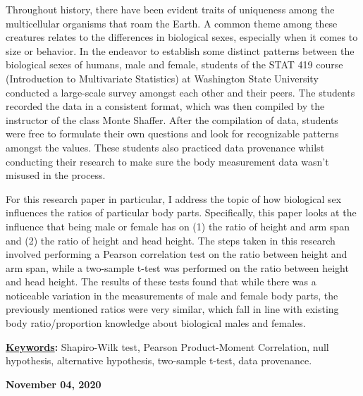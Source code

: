 \documentclass[]{article}
\renewenvironment{abstract}
 {{%
    \setlength{\leftmargin}{0mm}
    \setlength{\rightmargin}{\leftmargin}%
  }%
  \relax}
 {\endlist}
\begin{document}
\begin{abstract}

    \hbox{\vrule height .2pt width 39.14pc}

    \vskip 8.5pt %

\noindent Throughout history, there have been evident traits of uniqueness among
the multicellular organisms that roam the Earth. A common theme among
these creatures relates to the differences in biological sexes,
especially when it comes to size or behavior. In the endeavor to
establish some distinct patterns between the biological sexes of humans,
male and female, students of the STAT 419 course (Introduction to
Multivariate Statistics) at Washington State University conducted a
large-scale survey amongst each other and their peers. The students
recorded the data in a consistent format, which was then compiled by the
instructor of the class Monte Shaffer. After the compilation of data,
students were free to formulate their own questions and look for
recognizable patterns amongst the values. These students also practiced
data provenance whilst conducting their research to make sure the body
measurement data wasn't misused in the process.

\vspace{0.25cm}

For this research paper in particular, I address the topic of how
biological sex influences the ratios of particular body parts.
Specifically, this paper looks at the influence that being male or
female has on (1) the ratio of height and arm span and (2) the ratio of
height and head height. The steps taken in this research involved
performing a Pearson correlation test on the ratio between height and
arm span, while a two-sample t-test was performed on the ratio between
height and head height. The results of these tests found that while
there was a noticeable variation in the measurements of male and female
body parts, the previously mentioned ratios were very similar, which
fall in line with existing body ratio/proportion knowledge about
biological males and females.


\vskip 8.5pt \noindent \textbf{\underline{Keywords}:} Shapiro-Wilk test, Pearson Product-Moment Correlation, null hypothesis,
alternative hypothesis, two-sample t-test, data provenance. \par

    




    
    \hbox{\vrule height .2pt width 39.14pc}
    \vskip 5pt 
    \hfill \textbf{\textcolor{WSU.gray}{ November 04, 2020 } }
    \vskip 5pt 
    
\end{abstract}
\end{document}
